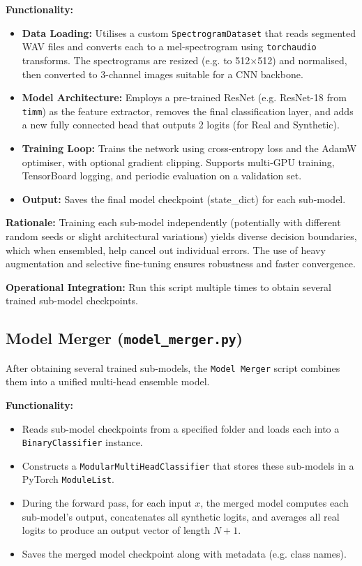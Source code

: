 \documentclass[conference]{IEEEtran}  %
\begin{document}
\textbf{Functionality:}
\begin{itemize}
    \item \textbf{Data Loading:} Utilises a custom \texttt{SpectrogramDataset} that reads segmented WAV files and converts each to a mel-spectrogram using \texttt{torchaudio} transforms. The spectrograms are resized (e.g. to 512\(\times\)512) and normalised, then converted to 3-channel images suitable for a CNN backbone.
    \item \textbf{Model Architecture:} Employs a pre-trained ResNet (e.g. ResNet-18 from \texttt{timm}) as the feature extractor, removes the final classification layer, and adds a new fully connected head that outputs 2 logits (for Real and Synthetic).
    \item \textbf{Training Loop:} Trains the network using cross-entropy loss and the AdamW optimiser, with optional gradient clipping. Supports multi-GPU training, TensorBoard logging, and periodic evaluation on a validation set.
    \item \textbf{Output:} Saves the final model checkpoint (state\_dict) for each sub-model.
\end{itemize}

\textbf{Rationale:} Training each sub-model independently (potentially with different random seeds or slight architectural variations) yields diverse decision boundaries, which when ensembled, help cancel out individual errors. The use of heavy augmentation and selective fine-tuning ensures robustness and faster convergence.

\textbf{Operational Integration:} Run this script multiple times to obtain several trained sub-model checkpoints.

\subsection{Model Merger (\texttt{model\_merger.py})}
After obtaining several trained sub-models, the \texttt{Model Merger} script combines them into a unified multi-head ensemble model.

\textbf{Functionality:}
\begin{itemize}
    \item Reads sub-model checkpoints from a specified folder and loads each into a \texttt{BinaryClassifier} instance.
    \item Constructs a \texttt{ModularMultiHeadClassifier} that stores these sub-models in a PyTorch \texttt{ModuleList}.
    \item During the forward pass, for each input \(x\), the merged model computes each sub-model’s output, concatenates all synthetic logits, and averages all real logits to produce an output vector of length \(N+1\).
    \item Saves the merged model checkpoint along with metadata (e.g. class names).
\end{itemize}
\end{document}
